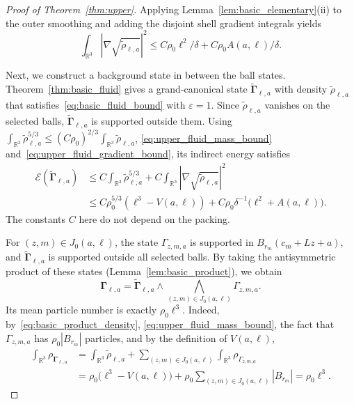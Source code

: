\documentclass[final,reqno]{amsart}
\theoremstyle{remark}
\theoremstyle{definition}
\renewcommand{\le}{\leqslant}
\newcommand{\RR}{\mathbb{R}}
\newcommand{\EC}{\mathcal{E}}
\newcommand{\vGamma}{{\bm{\Gamma}}}
\begin{document}
\begin{proof}[Proof of Theorem~\ref{thm:upper}]
Applying Lemma~\ref{lem:basic_elementary}(ii) to the outer smoothing and adding the disjoint shell gradient integrals yields
\begin{equation}\label{eq:upper_fluid_gradient_bound}
\int_{\RR^3}|\nabla\sqrt{\tilde\rho_{\ell,a}}|^2
\le C\rho_0\ell^2/\delta+C\rho_0A(a,\ell)/\delta.
\end{equation}

Next, we construct a background state in between the ball states. Theorem~\ref{thm:basic_fluid} gives a grand-canonical state $\tilde\vGamma_{\ell,a}$ with density $\tilde\rho_{\ell,a}$ that satisfies~\eqref{eq:basic_fluid_bound} with $\varepsilon=1$. Since $\tilde\rho_{\ell,a}$ vanishes on the selected balls, $\tilde\vGamma_{\ell,a}$ is supported outside them. Using $\int_{\RR^3}\tilde\rho_{\ell,a}^{5/3}\le(C\rho_0)^{2/3}\int_{\RR^3}\tilde\rho_{\ell,a}$, \eqref{eq:upper_fluid_mass_bound} and~\eqref{eq:upper_fluid_gradient_bound}, its indirect energy satisfies
\begin{equation}\label{eq:upper_fluid_energy_expanded}
\begin{aligned}
\EC(\tilde\vGamma_{\ell,a})
&\le C\int_{\RR^3}\tilde\rho_{\ell,a}^{5/3}
+C\int_{\RR^3}|\nabla\sqrt{\tilde\rho_{\ell,a}}|^2\\
&\le C\rho_0^{5/3}(\ell^3-V(a,\ell))
+C\rho_0\delta^{-1}\big(\ell^2+A(a,\ell)\big).
\end{aligned}
\end{equation}
The constants $C$ here do not depend on the packing.

For $(z,m)\in J_0(a,\ell)$, the state $\Gamma_{z,m,a}$ is supported in $B_{r_m}(c_m+Lz+a)$, and $\tilde\vGamma_{\ell,a}$ is supported outside all selected balls. By taking the antisymmetric product of these states (Lemma~\ref{lem:basic_product}), we obtain
\[
\vGamma_{\ell,a}=\tilde\vGamma_{\ell,a}\wedge\bigwedge_{(z,m)\in J_0(a,\ell)}\Gamma_{z,m,a}.
\]
Its mean particle number is exactly $\rho_0\ell^3$. Indeed, by~\eqref{eq:basic_product_density}, \eqref{eq:upper_fluid_mass_bound}, the fact that $\Gamma_{z,m,a}$ has $\rho_0|B_{r_m}|$ particles, and by the definition of $V(a,\ell)$,
\begin{align*}
\int_{\RR^3}\rho_{\vGamma_{\ell,a}}
&=\int_{\RR^3}\tilde\rho_{\ell,a}+\sum_{(z,m)\in J_0(a,\ell)}\int_{\RR^3}\rho_{\Gamma_{z,m,a}}\\
&=\rho_0\big(\ell^3-V(a,\ell)\big)+\rho_0\sum_{(z,m)\in J_0(a,\ell)}|B_{r_m}|
=\rho_0\ell^3.
\end{align*}


\end{proof}
\end{document}
